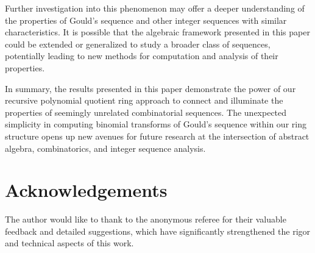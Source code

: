 \documentclass[12pt,reqno]{article}
\theoremstyle{plain}
\begin{document}
Further investigation into this phenomenon may offer a deeper understanding of the properties of Gould's sequence and other integer sequences with similar characteristics. It is possible that the algebraic framework presented in this paper could be extended or generalized to study a broader class of sequences, potentially leading to new methods for computation and analysis of their properties.

In summary, the results presented in this paper demonstrate the power of our recursive polynomial quotient ring approach to connect and illuminate the properties of seemingly unrelated combinatorial sequences. The unexpected simplicity in computing binomial transforms of Gould's sequence within our ring structure opens up new avenues for future research at the intersection of abstract algebra, combinatorics, and integer sequence analysis.

\section{Acknowledgements}
The author would like to thank to the anonymous referee for their valuable feedback and detailed suggestions, which have significantly strengthened the rigor and technical aspects of this work.

\begingroup
\raggedright


\endgroup
\end{document}
